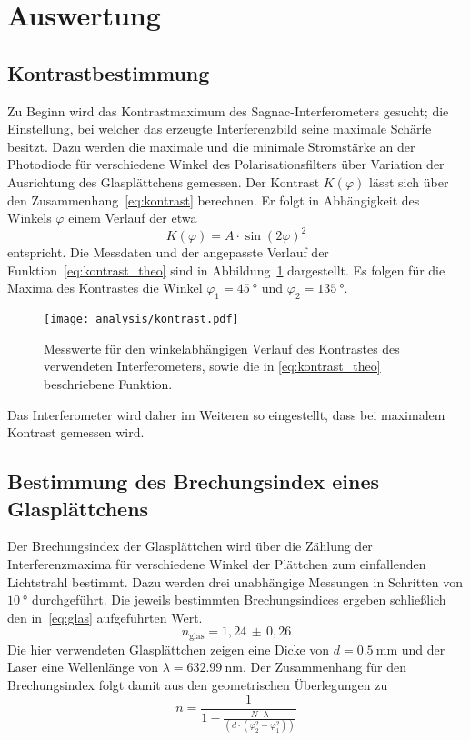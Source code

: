 \section{Auswertung}
\label{sec:auswertung}



\subsection{Kontrastbestimmung}
%
Zu Beginn wird das Kontrastmaximum des Sagnac-Interferometers gesucht; die
Einstellung, bei welcher das erzeugte Interferenzbild seine maximale Schärfe
besitzt. Dazu werden die maximale und die minimale Stromstärke an der
Photodiode für verschiedene Winkel des Polarisationsfilters über Variation der
Ausrichtung des Glasplättchens gemessen. Der Kontrast $K(\varphi)$ lässt sich
über den Zusammenhang~\eqref{eq:kontrast} berechnen. Er folgt in Abhängigkeit
des Winkels $\varphi$ einem Verlauf der etwa
%
\begin{equation}
  K(\varphi)=A\cdot\sin(2\varphi)^2
  \label{eq:kontrast_theo}
\end{equation}
%
entspricht. Die Messdaten und der angepasste Verlauf der
Funktion~\eqref{eq:kontrast_theo} sind in Abbildung~\ref{fig:kontrast}
dargestellt. Es folgen für die Maxima des Kontrastes die Winkel
$\varphi_1=\SI{45}{\degree}$ und $\varphi_2=\SI{135}{\degree}$.

\begin{figure}[htb]
  \centering
  \texttt{[image: analysis/kontrast.pdf]}
  \caption{Messwerte für den winkelabhängigen Verlauf des Kontrastes des verwendeten Interferometers, sowie die in \eqref{eq:kontrast_theo} beschriebene Funktion.}
  \label{fig:kontrast}
\end{figure}

Das Interferometer wird daher im Weiteren so eingestellt, dass bei
maximalem Kontrast gemessen wird.

\subsection{Bestimmung des Brechungsindex eines Glasplättchens}
%
Der Brechungsindex der Glasplättchen wird über die Zählung der Interferenzmaxima für verschiedene Winkel der Plättchen zum einfallenden Lichtstrahl bestimmt. Dazu werden drei unabhängige Messungen in Schritten von $\SI{10}{\degree}$ durchgeführt. Die jeweils bestimmten Brechungsindices ergeben schließlich den in~\eqref{eq:glas} aufgeführten Wert.
%
\begin{equation}
  n_\text{glas}= 1,24\,\pm\,0,26
  \label{eq:glas}
\end{equation}
%
Die hier verwendeten Glasplättchen zeigen eine Dicke von $d=\SI{0.5}{\milli\meter}$ und der Laser eine Wellenlänge von $\lambda=\SI{632.99}{\nano\meter}$. Der Zusammenhang für den Brechungsindex folgt damit aus den geometrischen Überlegungen zu
%
\begin{equation}
  n = \frac{1}{1 - \frac{N \cdot \lambda}{(d \cdot (\varphi_2^2 - \varphi_1^2))}}
\end{equation}

